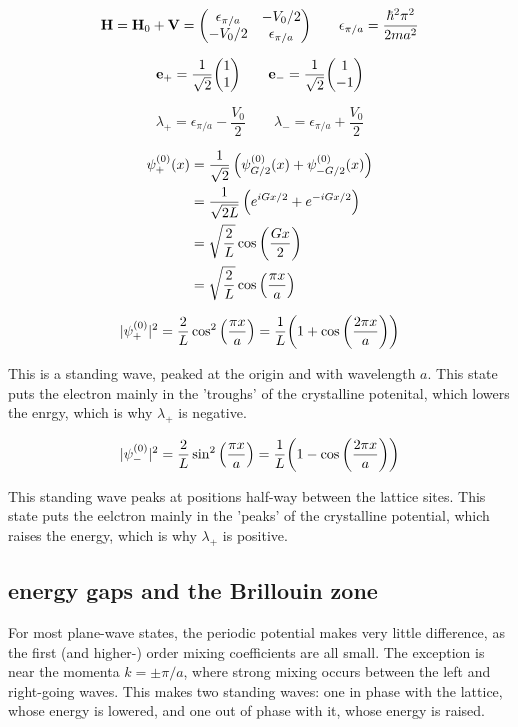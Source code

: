 \documentclass[10pt, a4paper, twocolumn]{article}
\begin{document}
\[\vb H = \vb H_0 + \vb V =
\mqty(\epsilon _{\pi/a} &-V_0/2
\\-V_0/2&\epsilon _{\pi/a})
\qquad \epsilon _{\pi/a} = \frac{\hbar ^2\pi ^2}{2ma^2} \]

\[ \vb e_+ = \frac{1}{\sqrt 2} \mqty(1\\1)
\qquad \vb e_- = \frac{1}{\sqrt 2} \mqty(1\\-1) \]

\[\lambda _+=\epsilon _{\pi/a} - \frac{V_0}{2}
\qquad \lambda _-=\epsilon _{\pi/a} + \frac{V_0}{2} \]

\begin{equation*}
\begin{aligned}
\psi _+^{(0)}(x) &= \frac{1}{\sqrt 2}
\left(\psi_{G/2}^{(0)}(x) + \psi_{-G/2}^{(0)}(x) \right)
\\&=\frac{1}{\sqrt{2L}}
\left(e^{iGx/2} + e^{-iGx/2} \right)
\\&=\sqrt{\frac2L} \cos \qty(\frac{Gx}{2})
\\&=\sqrt{\frac2L} \cos \qty(\frac{\pi x}{a})
\end{aligned}
\end{equation*}

\[|\psi _+^{(0)}|^2 =\frac2L
\cos ^2\qty(\frac{\pi x}{a})
=\frac1L\qty(1+\cos\qty(\frac{2\pi x}{a})) \]

This is a standing wave, peaked at the origin and with wavelength $a$. This state puts the electron mainly in the 'troughs' of the crystalline potenital, which lowers the enrgy, which is why $\lambda _+$ is negative.

\[|\psi _-^{(0)}|^2 =\frac2L
\sin ^2\qty(\frac{\pi x}{a})
=\frac1L\qty(1-\cos\qty(\frac{2\pi x}{a})) \]

This standing wave peaks at positions half-way between the lattice sites. This state puts the eelctron mainly in the 'peaks' of the crystalline potential, which raises the energy, which is why $\lambda _+$ is positive.

\subsection{energy gaps and the Brillouin zone}

For most plane-wave states, the periodic potential makes very little difference, as the first (and higher-) order mixing coefficients are all small. The exception is near the momenta $k=\pm\pi/a$, where strong mixing occurs between the left and right-going waves. This makes two standing waves: one in phase with the lattice, whose energy is lowered, and one out of phase with it, whose energy is raised.
\end{document}
